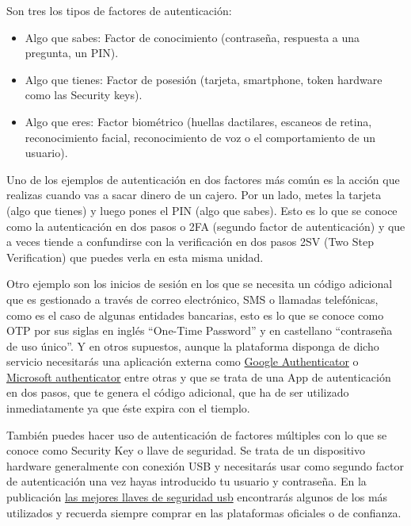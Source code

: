 \documentclass[
  a4paper,
  openany]{book}
\begin{document}
Son tres los tipos de factores de autenticación:

\begin{itemize}
\item
  Algo que sabes: Factor de conocimiento (contraseña, respuesta a una pregunta, un PIN).
\item
  Algo que tienes: Factor de posesión (tarjeta, smartphone, token hardware como las Security keys).
\item
  Algo que eres: Factor biométrico (huellas dactilares, escaneos de retina, reconocimiento facial, reconocimiento de voz o el comportamiento de un usuario).
\end{itemize}

Uno de los ejemplos de autenticación en dos factores más común es la acción que realizas cuando vas a sacar dinero de un cajero. Por un lado, metes la tarjeta (algo que tienes) y luego pones el PIN (algo que sabes). Esto es lo que se conoce como la autenticación en dos pasos o 2FA (segundo factor de autenticación) y que a veces tiende a confundirse con la verificación en dos pasos 2SV (Two Step Verification) que puedes verla en esta misma unidad.

Otro ejemplo son los inicios de sesión en los que se necesita un código adicional que es gestionado a través de correo electrónico, SMS o llamadas telefónicas, como es el caso de algunas entidades bancarias, esto es lo que se conoce como OTP por sus siglas en inglés ``One-Time Password'' y en castellano ``contraseña de uso único''. Y en otros supuestos, aunque la plataforma disponga de dicho servicio necesitarás una aplicación externa como \href{https://support.google.com/accounts/answer/1066447?co=GENIE.Platform\%3DAndroid\&hl=es-419}{Google Authenticator} o \href{https://www.microsoft.com/es-es/account/authenticator}{Microsoft authenticator} entre otras y que se trata de una App de autenticación en dos pasos, que te genera el código adicional, que ha de ser utilizado inmediatamente ya que éste expira con el tiemplo.

También puedes hacer uso de autenticación de factores múltiples con lo que se conoce como Security Key o llave de seguridad. Se trata de un dispositivo hardware generalmente con conexión USB y necesitarás usar como segundo factor de autenticación una vez hayas introducido tu usuario y contraseña. En la publicación \href{https://es.digitaltrends.com/computadoras/las-mejores-llaves-de-seguridad-usb/}{las mejores llaves de seguridad usb} encontrarás algunos de los más utilizados y recuerda siempre comprar en las plataformas oficiales o de confianza.
\end{document}
